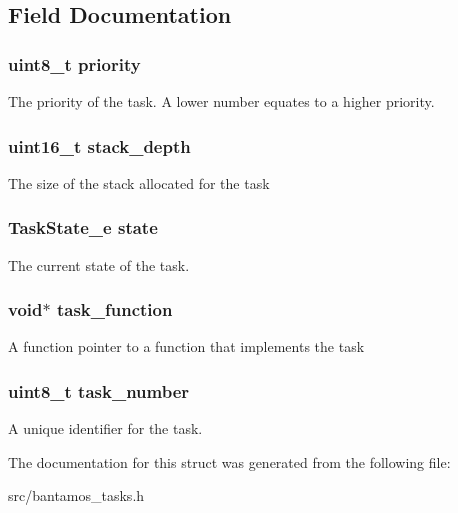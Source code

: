 \subsection{Field Documentation}
\hypertarget{struct_task_status__t_a0ad043071ccc7a261d79a759dc9c6f0c}{
\subsubsection[{priority}]{\setlength{\rightskip}{0pt plus 5cm}uint8\-\_\-t priority}}\label{struct_task_status__t_a0ad043071ccc7a261d79a759dc9c6f0c}
The priority of the task. A lower number equates to a higher priority. \hypertarget{struct_task_status__t_a871d318da2b64860c69302300b85674a}{
\subsubsection[{stack\-\_\-depth}]{\setlength{\rightskip}{0pt plus 5cm}uint16\-\_\-t stack\-\_\-depth}}\label{struct_task_status__t_a871d318da2b64860c69302300b85674a}
The size of the stack allocated for the task \hypertarget{struct_task_status__t_a574eb235ee9dadcd5113f49f05b87a61}{
\subsubsection[{state}]{\setlength{\rightskip}{0pt plus 5cm}Task\-State\-\_\-e state}}\label{struct_task_status__t_a574eb235ee9dadcd5113f49f05b87a61}
The current state of the task. \hypertarget{struct_task_status__t_a27f8af792ccfae5edfbbfc732854ea24}{
\subsubsection[{task\-\_\-function}]{\setlength{\rightskip}{0pt plus 5cm}void$\ast$ task\-\_\-function}}\label{struct_task_status__t_a27f8af792ccfae5edfbbfc732854ea24}
A function pointer to a function that implements the task \hypertarget{struct_task_status__t_ae1ced017faebaf11cad29bdb7bef902b}{
\subsubsection[{task\-\_\-number}]{\setlength{\rightskip}{0pt plus 5cm}uint8\-\_\-t task\-\_\-number}}\label{struct_task_status__t_ae1ced017faebaf11cad29bdb7bef902b}
A unique identifier for the task. 

The documentation for this struct was generated from the following file\-:\begin{DoxyCompactItemize}
\item 
src/bantamos\-\_\-tasks.\-h\end{DoxyCompactItemize}
